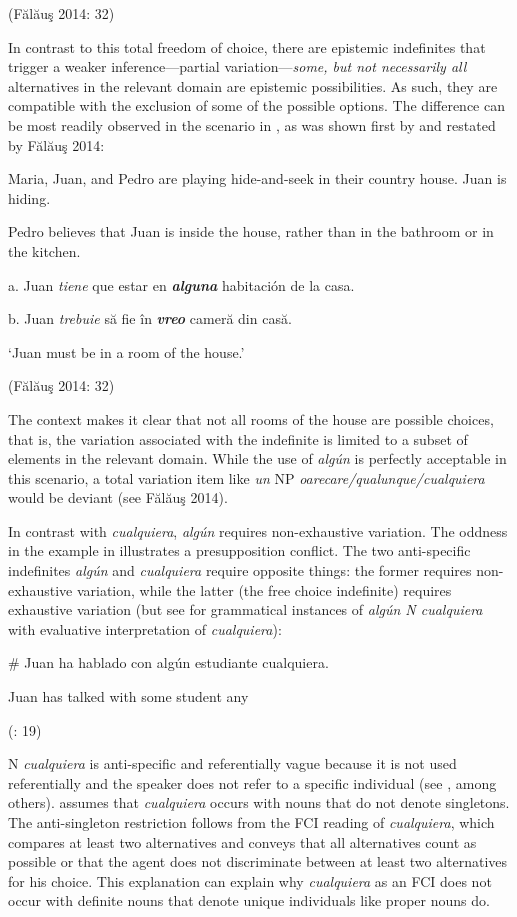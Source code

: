   (Fălăuş 2014: 32)

In contrast to this total freedom of choice, there are epistemic indefinites that trigger a weaker inference—partial variation—\textit{some, but not necessarily all} alternatives in the relevant domain are epistemic possibilities. As such, they are compatible with the exclusion of some of the possible options. The difference can be most readily observed in the scenario in , as was shown first by \citet{Alonso-OvalleMenéndez-Benito2010} and restated by Fălăuş 2014:

\label{bkm:Ref533761939}  Maria, Juan, and Pedro are playing hide-and-seek in their country house. Juan is hiding. 

Pedro believes that Juan is inside the house, rather than in the bathroom or in the kitchen.

  a.  Juan \textit{tiene} que estar en \textbf{\textit{alguna}} habitación de la casa.

  b.  Juan \textit{trebuie} să fie în \textbf{\textit{vreo}} cameră din casă.

    ‘Juan must be in a room of the house.’

    (Fălăuş 2014: 32)

The context makes it clear that not all rooms of the house are possible choices, that is, the variation associated with the indefinite is limited to a subset of elements in the relevant domain. While the use of \textit{algún} is perfectly acceptable in this scenario, a total variation item like \textit{un} NP \textit{oarecare/qualunque/cualquiera} would be deviant (see Fălăuş 2014).

  In contrast with \textit{cualquiera}, \textit{algún} requires non-exhaustive variation. The oddness in the example in  illustrates a presupposition conflict. The two anti-specific indefinites \textit{algún} and \textit{cualquiera} require opposite things: the former requires non-exhaustive variation, while the latter (the free choice indefinite) requires exhaustive variation (but see  for grammatical instances of \textit{algún N cualquiera} with evaluative interpretation of \textit{cualquiera}):

\label{bkm:Ref533761963}  \# Juan ha hablado con algún estudiante cualquiera.

  Juan has talked with some student any 

  (\citealt{EtxeberriaGiannakidou2017}: 19)

N \textit{cualquiera} is anti-specific and referentially vague because it is not used referentially and the speaker does not refer to a specific individual (see \citealt{GiannakidouQuer2013}, among others). \citet{Menéndez-Benito2010} assumes that \textit{cualquiera} occurs with nouns that do not denote singletons. The anti-singleton restriction follows from the FCI reading of \textit{cualquiera}, which compares at least two alternatives and conveys that all alternatives count as possible or that the agent does not discriminate between at least two alternatives for his choice. This explanation can explain why \textit{cualquiera} as an FCI does not occur with definite nouns that denote unique individuals like proper nouns do. 

